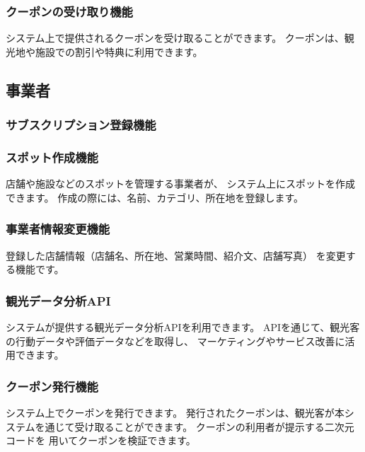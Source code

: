 \documentclass{docs}
\begin{document}
\subsubsection{クーポンの受け取り機能}
システム上で提供されるクーポンを受け取ることができます。
クーポンは、観光地や施設での割引や特典に利用できます。

\subsection{事業者}

\subsubsection{サブスクリプション登録機能}

\subsubsection{スポット作成機能}
店舗や施設などのスポットを管理する事業者が、
システム上にスポットを作成できます。
作成の際には、名前、カテゴリ、所在地を登録します。



\subsubsection{事業者情報変更機能}
登録した店舗情報（店舗名、所在地、営業時間、紹介文、店舗写真）
を変更する機能です。

\subsubsection{観光データ分析API}
システムが提供する観光データ分析APIを利用できます。
APIを通じて、観光客の行動データや評価データなどを取得し、
マーケティングやサービス改善に活用できます。

\subsubsection{クーポン発行機能}
システム上でクーポンを発行できます。
発行されたクーポンは、観光客が本システムを通じて受け取ることができます。
クーポンの利用者が提示する二次元コードを
用いてクーポンを検証できます。
\end{document}
